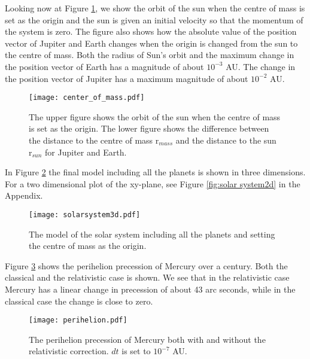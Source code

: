 Looking now at Figure \ref{fig:centre of mass}, we show the orbit of the sun when the centre of mass is set as the origin and the sun is given an initial velocity so that the momentum of the system is zero. The figure also shows how the absolute value of the position vector of Jupiter and Earth changes when the origin is changed from the sun to the centre of mass. Both the radius of Sun's orbit and the maximum change in the position vector of Earth has a magnitude of about $10^{-3}$ AU. The change in the position vector of Jupiter has a maximum magnitude of about $10^{-2}$ AU.
\begin{figure}[htbp]
	\centering
	\texttt{[image: center\_of\_mass.pdf]}
	\caption{The upper figure shows the orbit of the sun when the centre of mass is set as the origin. The lower figure shows the difference between the distance to the centre of mass r$_{mass}$ and the distance to the sun r$_{sun}$ for Jupiter and Earth.}
	\label{fig:centre of mass}
\end{figure}

In Figure \ref{fig:solar system} the final model including all the planets is shown in three dimensions. For a two dimensional plot of the xy-plane, see Figure \ref{fig:solar system2d} in the Appendix.
\begin{figure}[htbp]
	\centering
	\texttt{[image: solarsystem3d.pdf]}
	\caption{The model of the solar system including all the planets and setting the centre of mass as the origin.}
	\label{fig:solar system}
\end{figure}

Figure \ref{fig:perihelion} shows the perihelion precession of Mercury over a century. Both the classical and the relativistic case is shown. We see that in the relativistic case Mercury has a linear change in precession of about 43 arc seconds, while in the classical case the change is close to zero.
\begin{figure}[htbp]
	\centering
	\texttt{[image: perihelion.pdf]}
	\caption{The perihelion precession of Mercury both with and without the relativistic correction. $dt$ is set to $10^{-7}$ AU.}
	\label{fig:perihelion}
\end{figure}
